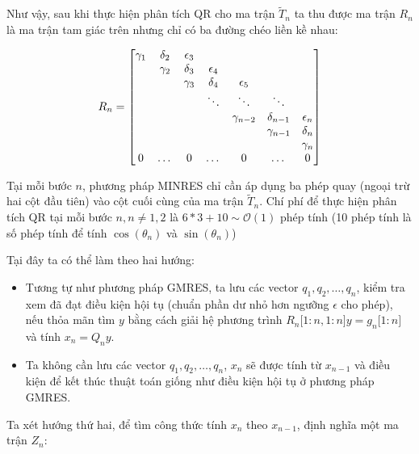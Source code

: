 \documentclass[14pt, a4paper]{article}
\numberwithin{equation}{section}
\numberwithin{algorithm}{section}
\numberwithin{figure}{section}
\numberwithin{dl}{section}
\numberwithin{md}{section}
\numberwithin{bd}{section}
\numberwithin{dn}{section}
\begin{document}
Như vậy, sau khi thực hiện phân tích QR cho ma trận $\widetilde{T}_n$ ta thu được ma trận $R_n$ là ma trận tam giác trên nhưng chỉ có ba đường chéo liền kề nhau:

\begin{equation}
    R_n = \begin{bmatrix}
        \gamma_1 & \delta_2 & \epsilon_3 & \space & \space & \space & \space \\
        \space & \gamma_2 & \delta_3 & \epsilon_4 & \space & \space & \space \\
        \space & \space  & \gamma_3 & \delta_4 & \epsilon_5 & \space & \space \\
        \space & \space & \space & \ddots & \ddots & \ddots & \space \\
        \space & \space & \space & \space & \gamma_{n-2} & \delta_{n-1} & \epsilon_n \\
        \space & \space & \space & \space & \space & \gamma_{n-1} & \delta_n \\
        \space & \space & \space & \space & \space & \space & \gamma_n \\
        0 & \dots & 0 & \dots & 0 & \dots & 0
    \end{bmatrix}
\end{equation}

Tại mỗi bước $n$, phương pháp MINRES chỉ cần áp dụng ba phép quay (ngoại trừ hai cột đầu tiên) vào cột cuối cùng của ma trận $\widetilde{T}_n$. Chí phí để thực hiện phân tích QR tại mỗi bước $n, n \neq 1, 2$ là $6*3 + 10 \sim \mathcal{O}(1)$ phép tính (10 phép tính là số phép tính để tính $\cos(\theta_n)$ và $\sin(\theta_n)$)

Tại đây ta có thể làm theo hai hướng:

\begin{itemize}
    \item Tương tự như phương pháp GMRES, ta lưu các vector $q_1, q_2, \dots, q_n$, kiểm tra xem đã đạt điều kiện hội tụ (chuẩn phần dư nhỏ hơn ngưỡng $\epsilon$ cho phép), nếu thỏa mãn tìm $y$ bằng cách giải hệ phương trình $R_n\lbrack 1:n, 1:n\rbrack y=g_n\lbrack 1:n \rbrack$ và tính $x_n=Q_n y$.
    \item Ta không cần lưu các vector $q_1, q_2, \dots, q_n$, $x_n$ sẽ được tính từ $x_{n-1}$ và điều kiện để kết thúc thuật toán giống như điều kiện hội tụ ở phương pháp GMRES.
\end{itemize}

Ta xét hướng thứ hai, để tìm công thức tính $x_n$ theo $x_{n-1}$, \cite{greenbaum1997iterative} định nghĩa một ma trận $Z_n$:
\end{document}
